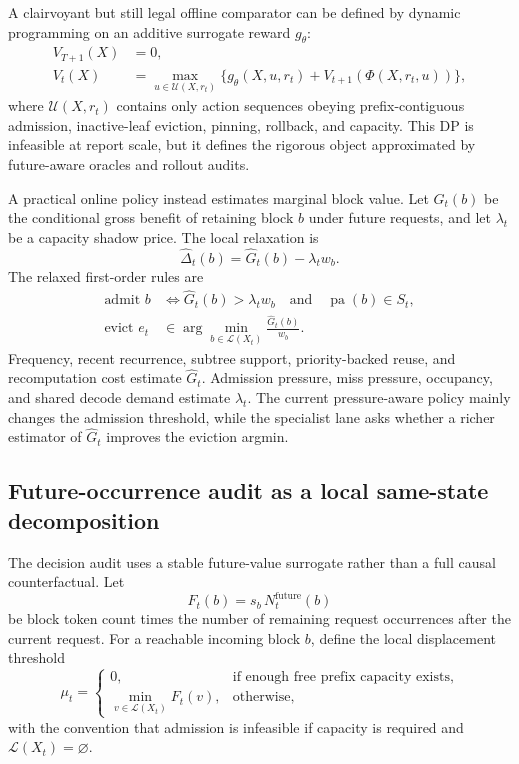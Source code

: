 \documentclass[11pt]{article}
\begin{document}
A clairvoyant but still legal offline comparator can be defined by dynamic programming
on an additive surrogate reward \(g_\theta\):
\begin{align}
  V_{T+1}(X)&=0,\\
  V_t(X)&=\max_{u\in\mathcal U(X,r_t)}
  \{g_\theta(X,u,r_t)+V_{t+1}(\Phi(X,r_t,u))\},
  \label{eq:offline-regime-dp}
\end{align}
where \(\mathcal U(X,r_t)\) contains only action sequences obeying prefix-contiguous
admission, inactive-leaf eviction, pinning, rollback, and capacity.  This DP is
infeasible at report scale, but it defines the rigorous object approximated by
future-aware oracles and rollout audits.

A practical online policy instead estimates marginal block value.  Let \(G_t(b)\) be
the conditional gross benefit of retaining block \(b\) under future requests, and let
\(\lambda_t\) be a capacity shadow price.  The local relaxation is
\begin{equation}
  \widehat\Delta_t(b)=\widehat G_t(b)-\lambda_t w_b.
  \label{eq:local-shadow-regime}
\end{equation}
The relaxed first-order rules are
\begin{align}
  \text{admit } b
  &\Longleftrightarrow
  \widehat G_t(b)>\lambda_t w_b
  \quad\text{and}\quad \operatorname{pa}(b)\in S_t,
  \label{eq:relaxed-admission-regime}\\
  \text{evict } e_t
  &\in\arg\min_{b\in\mathcal L(X_t)}
  \frac{\widehat G_t(b)}{w_b}.
  \label{eq:relaxed-eviction-regime}
\end{align}
Frequency, recent recurrence, subtree support, priority-backed reuse, and recomputation
cost estimate \(\widehat G_t\).  Admission pressure, miss pressure, occupancy, and
shared decode demand estimate \(\lambda_t\).  The current pressure-aware policy mainly
changes the admission threshold, while the specialist lane asks whether a richer
estimator of \(\widehat G_t\) improves the eviction argmin.

\subsection{Future-occurrence audit as a local same-state decomposition}

The decision audit uses a stable future-value surrogate rather than a full causal
counterfactual.  Let
\begin{equation}
  F_t(b)=s_b\,N_t^{\mathrm{future}}(b)
\end{equation}
be block token count times the number of remaining request occurrences after the
current request.  For a reachable incoming block \(b\), define the local displacement
threshold
\begin{equation}
  \mu_t=
  \begin{cases}
    0, & \text{if enough free prefix capacity exists},\\
    \min_{v\in\mathcal L(X_t)} F_t(v), & \text{otherwise},
  \end{cases}
  \label{eq:local-displacement-threshold}
\end{equation}
with the convention that admission is infeasible if capacity is required and
\(\mathcal L(X_t)=\varnothing\).
\end{document}
